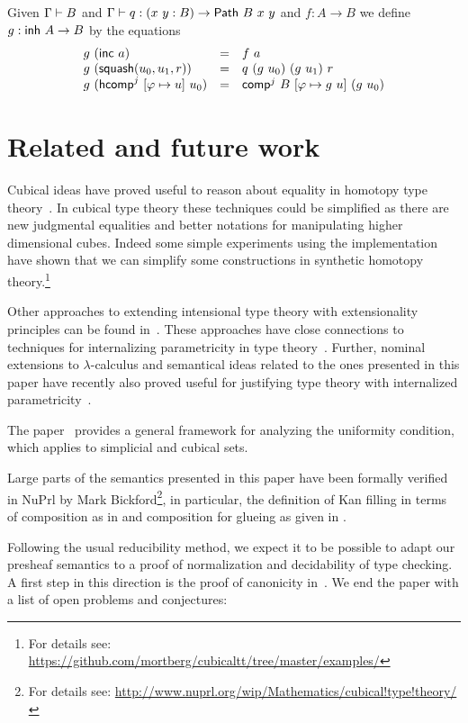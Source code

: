 \medskip

Given $\Gamma \vdash B$ and
$\Gamma \vdash q : (x~y : B) \rightarrow {\sf Path}~B~x~y$ and
$f : A \rightarrow B$ we define $g : \mathsf{inh}~A \rightarrow B$ by the
equations
%
\[
\begin{array}{lcl}
g~({\sf inc}~a) & = & f~a \\
g~({\sf squash}(u_0,u_1,r)) & = & q~(g~u_0)~(g~u_1)~r \\
g~({\sf hcomp}^j~[\varphi \mapsto u]~u_0) & = & {\sf comp}^j~B~[\varphi \mapsto g~u]~(g~u_0)
\end{array}
\]


\section{Related and future work}\label{section:conclusion}

Cubical ideas have proved useful to reason about equality in homotopy
type theory~\cite{LicataBrunerie}. In cubical type theory these
techniques could be simplified as there are new judgmental equalities
and better notations for manipulating higher dimensional cubes. Indeed
some simple experiments using the \Haskell{} implementation have shown
that we can simplify some constructions in synthetic homotopy
theory.\footnote{For details see:
  \url{https://github.com/mortberg/cubicaltt/tree/master/examples/}}

Other approaches to extending intensional type theory with
extensionality principles can be found
in~\cite{Altenkirch99,Polonsky14}. These approaches have close
connections to techniques for internalizing parametricity in type
theory~\cite{ttincolor}. Further, nominal extensions to
$\lambda$-calculus and semantical ideas related to the ones presented
in this paper have recently also proved useful for justifying type
theory with internalized parametricity~\cite{paramtt}.

The paper~\cite{GambinoSattler} provides a general framework for
analyzing the uniformity condition, which applies to simplicial and
cubical sets.

Large parts of the semantics presented in this paper have been
formally verified in NuPrl by Mark Bickford\footnote{For details see:
  \url{http://www.nuprl.org/wip/Mathematics/cubical!type!theory/}}, in
particular, the definition of Kan filling in terms of composition as
in  and composition for glueing as given in
.

\medskip

Following the usual reducibility method, we expect it to be possible
to adapt our presheaf semantics to a proof of normalization and
decidability of type checking.  A first step in this direction is the
proof of canonicity in~\cite{Huber16}.  We end the paper with a list
of open problems and conjectures:

